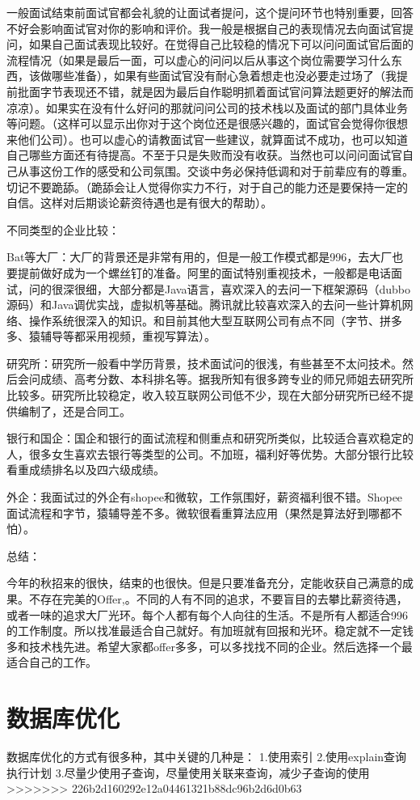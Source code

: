 \documentclass[UTF8]{ctexart}
\begin{document}
一般面试结束前面试官都会礼貌的让面试者提问，这个提问环节也特别重要，回答不好会影响面试官对你的影响和评价。我一般是根据自己的表现情况去向面试官提问，如果自己面试表现比较好。在觉得自己比较稳的情况下可以问问面试官后面的流程情况（如果是最后一面，可以虚心的问问以后从事这个岗位需要学习什么东西，该做哪些准备），如果有些面试官没有耐心急着想走也没必要走过场了（我提前批面字节表现还不错，就是因为最后自作聪明抓着面试官问算法题更好的解法而凉凉）。如果实在没有什么好问的那就问问公司的技术栈以及面试的部门具体业务等问题。（这样可以显示出你对于这个岗位还是很感兴趣的，面试官会觉得你很想来他们公司）。也可以虚心的请教面试官一些建议，就算面试不成功，也可以知道自己哪些方面还有待提高。不至于只是失败而没有收获。当然也可以问问面试官自己从事这份工作的感受和公司氛围。交谈中务必保持低调和对于前辈应有的尊重。切记不要跪舔。（跪舔会让人觉得你实力不行，对于自己的能力还是要保持一定的自信。这样对后期谈论薪资待遇也是有很大的帮助）。

不同类型的企业比较：

Bat等大厂：大厂的背景还是非常有用的，但是一般工作模式都是996，去大厂也要提前做好成为一个螺丝钉的准备。阿里的面试特别重视技术，一般都是电话面试，问的很深很细，大部分都是Java语言，喜欢深入的去问一下框架源码（dubbo源码）和Java调优实战，虚拟机等基础。腾讯就比较喜欢深入的去问一些计算机网络、操作系统很深入的知识。和目前其他大型互联网公司有点不同（字节、拼多多、猿辅导等都采用视频，重视写算法）。

研究所：研究所一般看中学历背景，技术面试问的很浅，有些甚至不太问技术。然后会问成绩、高考分数、本科排名等。据我所知有很多跨专业的师兄师姐去研究所比较多。研究所比较稳定，收入较互联网公司低不少，现在大部分研究所已经不提供编制了，还是合同工。

银行和国企：国企和银行的面试流程和侧重点和研究所类似，比较适合喜欢稳定的人，很多女生喜欢去银行等类型的公司。不加班，福利好等优势。大部分银行比较看重成绩排名以及四六级成绩。

外企：我面试过的外企有shopee和微软，工作氛围好，薪资福利很不错。Shopee面试流程和字节，猿辅导差不多。微软很看重算法应用（果然是算法好到哪都不怕）。

总结：

今年的秋招来的很快，结束的也很快。但是只要准备充分，定能收获自己满意的成果。不存在完美的Offer,。不同的人有不同的追求，不要盲目的去攀比薪资待遇，或者一味的追求大厂光环。每个人都有每个人向往的生活。不是所有人都适合996的工作制度。所以找准最适合自己就好。有加班就有回报和光环。稳定就不一定钱多和技术栈先进。希望大家都offer多多，可以多找找不同的企业。然后选择一个最适合自己的工作。


\section{数据库优化}
数据库优化的方式有很多种，其中关键的几种是：
1.使用索引
2.使用explain查询执行计划
3.尽量少使用子查询，尽量使用关联来查询，减少子查询的使用
>>>>>>> 226b2d160292e12a04461321b88dc96b2d6d0b63
\end{document}
